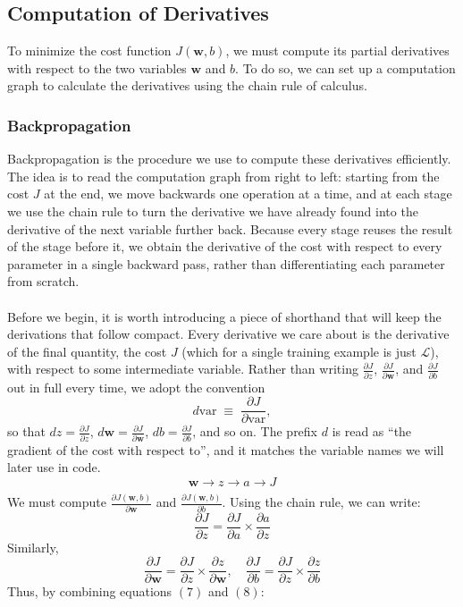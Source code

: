\documentclass{article}
\begin{document}
\subsection{Computation of Derivatives}
To minimize the cost function $J(\mathbf{w},b)$, we must compute its partial derivatives with respect to the two variables $\mathbf{w}$ and $b$. To do so, we can set up a computation graph to calculate the derivatives using the chain rule of calculus.
\subsubsection{Backpropagation}
Backpropagation is the procedure we use to compute these derivatives efficiently. The idea is to read the computation graph from right to left: starting from the cost $J$ at the end, we move backwards one operation at a time, and at each stage we use the chain rule to turn the derivative we have already found into the derivative of the next variable further back. Because every stage reuses the result of the stage before it, we obtain the derivative of the cost with respect to every parameter in a single backward pass, rather than differentiating each parameter from scratch.
\\
\\
Before we begin, it is worth introducing a piece of shorthand that will keep the derivations that follow compact. Every derivative we care about is the derivative of the final quantity, the cost $J$ (which for a single training example is just $\mathcal{L}$), with respect to some intermediate variable. Rather than writing $\frac{\partial J}{\partial z}$, $\frac{\partial J}{\partial \mathbf{w}}$, and $\frac{\partial J}{\partial b}$ out in full every time, we adopt the convention
$$d\text{var} \;\equiv\; \frac{\partial J}{\partial \text{var}},$$
so that $dz = \frac{\partial J}{\partial z}$, $d\mathbf{w} = \frac{\partial J}{\partial \mathbf{w}}$, $db = \frac{\partial J}{\partial b}$, and so on. The prefix $d$ is read as ``the gradient of the cost with respect to'', and it matches the variable names we will later use in code.
$$\mathbf{w} \xrightarrow{} z \xrightarrow[]{} a \xrightarrow{} J$$
We must compute $\frac{\partial J(\mathbf{w},b)}{\partial \mathbf{w}}$ and $\frac{\partial J(\mathbf{w}, b)}{\partial b}$. Using the chain rule, we can write:
\begin{equation}
    \frac{\partial J}{\partial z}=\frac{\partial J}{\partial a} \times \frac{\partial a}{\partial z}
\end{equation}
Similarly,
\begin{equation}
    \frac{\partial J}{\partial \mathbf{w}}=\frac{\partial J}{\partial z} \times \frac{\partial z}{\partial \mathbf{w}}, \quad \frac{\partial J}{\partial b}=\frac{\partial J}{\partial z} \times \frac{\partial z}{\partial b}
\end{equation}
Thus, by combining equations $(7)$ and $(8)$:
\end{document}
